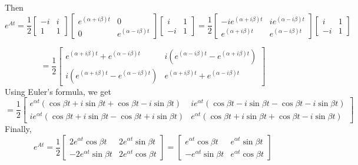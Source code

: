 \documentclass[12pt]{article}
\numberwithin{equation}{section}
\begin{document}
\begin{enumerate}
    Then
    $$e^{At}=\frac{1}{2}\left[\begin{array}{cc}-i&i\\1&1\end{array}\right]\left[\begin{array}{cc}e^{(\alpha+i\beta)t}&0\\0&e^{(\alpha-i\beta)t}\end{array}\right]\left[\begin{array}{cc}i&1\\-i&1\end{array}\right]=\frac{1}{2}\left[\begin{array}{cc}-ie^{(\alpha+i\beta)t}&ie^{(\alpha-i\beta)t}\\e^{(\alpha+i\beta)t}&e^{(\alpha-i\beta)t}\end{array}\right]\left[\begin{array}{cc}i&1\\-i&1\end{array}\right]$$

    $$=\frac{1}{2}\left[\begin{array}{cc}e^{(\alpha+i\beta)t}+e^{(\alpha-i\beta)t}&i(e^{(\alpha-i\beta)t}-e^{(\alpha+i\beta)t})\\i(e^{(\alpha+i\beta)t}-e^{(\alpha-i\beta)t})&e^{(\alpha+i\beta)t}+e^{(\alpha-i\beta)t}\end{array}\right]$$
    Using Euler's formula, we get
    $$=\frac{1}{2}\left[\begin{array}{cc}e^{\alpha t}(\cos{\beta t}+i\sin{\beta t}+\cos{\beta t}-i\sin{\beta t})&ie^{\alpha t}(\cos{\beta t}-i\sin{\beta t}-\cos{\beta t}-i\sin{\beta t})\\ie^{\alpha t}(\cos{\beta t}+i\sin{\beta t}-\cos{\beta t}+i\sin{\beta t})&e^{\alpha t}(\cos{\beta t}+i\sin{\beta t}+\cos{\beta t}-i\sin{\beta t})\end{array}\right]$$
    Finally,
    $$e^{At}=\frac{1}{2}\left[\begin{array}{cc}2e^{\alpha t}\cos{\beta t}&2e^{\alpha t}\sin{\beta t}\\-2e^{\alpha t}\sin{\beta t}&2e^{\alpha t}\cos{\beta t}\end{array}\right]=\left[\begin{array}{cc}e^{\alpha t}\cos{\beta t}&e^{\alpha t}\sin{\beta t}\\-e^{\alpha t}\sin{\beta t}&e^{\alpha t}\cos{\beta t}\end{array}\right]$$

\end{enumerate}
\end{document}

